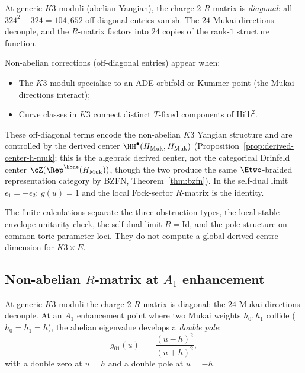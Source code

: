 \begin{remark}
\label{rem:charge2-offdiagonal}
At generic $K3$ moduli (abelian Yangian), the charge-$2$
$R$-matrix is \emph{diagonal}: all $324^2 - 324 = 104{,}652$
off-diagonal entries vanish. The $24$ Mukai directions decouple,
and the $R$-matrix factors into $24$ copies of the rank-$1$
structure function.

Non-abelian corrections (off-diagonal entries) appear when:
\begin{itemize}
 \item The $K3$ moduli specialise to an ADE orbifold or Kummer
 point (the Mukai directions interact);
 \item Curve classes in $K3$ connect distinct $T$-fixed components
 of $\mathrm{Hilb}^2$.
\end{itemize}
These off-diagonal terms encode the non-abelian $K3$ Yangian
structure and are controlled by the derived center
$\HH^\bullet(H_{\mathrm{Muk}}, H_{\mathrm{Muk}})$
(Proposition~\ref{prop:derived-center-h-muk};
this is the algebraic derived center, not the
categorical Drinfeld center $\cZ(\Rep^{\Eone}(H_{\mathrm{Muk}}))$,
though the two produce the same $\Etwo$-braided representation
category by BZFN, Theorem~\ref{thm:bzfn}).
In the self-dual limit $\epsilon_1 = -\epsilon_2$: $g(u) = 1$
and the local Fock-sector \(R\)-matrix is the identity.
\end{remark}

The finite calculations separate the three obstruction types, the local
stable-envelope unitarity check, the self-dual limit \(R=\mathrm{Id}\),
and the pole structure on common toric parameter loci. They do not
compute a global derived-centre dimension for \(K3\times E\).


\subsection{Non-abelian \texorpdfstring{$R$}{R}-matrix at \texorpdfstring{$A_1$}{A-1} enhancement}
\label{subsec:nonabelian-rmatrix-a1}

At generic $K3$ moduli the charge-$2$ $R$-matrix is diagonal:
the $24$ Mukai directions decouple. At an $A_1$ enhancement
point where two Mukai weights $h_0, h_1$ collide ($h_0 = h_1 = h$),
the abelian eigenvalue develops a \emph{double pole}:
\[
 g_{01}(u) \;=\; \frac{(u-h)^2}{(u+h)^2},
\]
with a double zero at $u = h$ and a double pole at $u = -h$.

